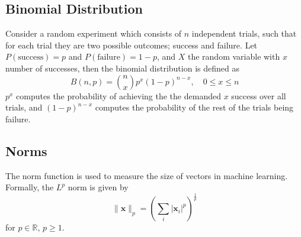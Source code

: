 \documentclass[12pt]{report}
\numberwithin{equation}{section}
\begin{document}
\subsection{Binomial Distribution}
Consider a random experiment which consists of $n$ independent trials, such that for each trial they are two possible outcomes; success and failure. Let $P(\text{success})=p$ and $P(\text{failure})=1-p$, and $X$ the random variable with $x$ number of successes, then the binomial distribution is defined as 
\begin{equation}\label{binomial}
B(n,p) = \binom{n}{x}p^x(1-p)^{n-x}, \quad 0\leq x \leq n 
\end{equation} 
$p^x$ computes the probability of achieving the the demanded $x$ success over all trials, and $(1-p)^{n-x}$ computes the probability of the rest of the trials being failure.  

\subsection{Norms}\label{sub:norm}
The norm function is used to measure the size of vectors in machine learning. Formally, the $L^p$ norm is given by 
\begin{equation}\label{eqn:lp-norm}
\|\bm{x}\|_p = \left( \sum_i|\bm{x}_i|^p \right)^{\frac{1}{p}}
\end{equation} 
for $p\in\mathbb{R}$, $p\geq 1$.
\end{document}
